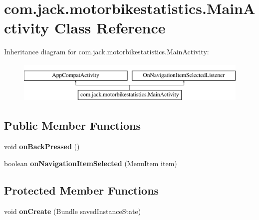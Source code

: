 \hypertarget{classcom_1_1jack_1_1motorbikestatistics_1_1_main_activity}{}\section{com.\+jack.\+motorbikestatistics.\+Main\+Activity Class Reference}
\label{classcom_1_1jack_1_1motorbikestatistics_1_1_main_activity}
Inheritance diagram for com.\+jack.\+motorbikestatistics.\+Main\+Activity\+:\begin{figure}[H]
\begin{center}
\leavevmode
\includegraphics[height=2.000000cm]{classcom_1_1jack_1_1motorbikestatistics_1_1_main_activity}
\end{center}
\end{figure}
\subsection*{Public Member Functions}
\begin{DoxyCompactItemize}
\item 
\mbox{\label{classcom_1_1jack_1_1motorbikestatistics_1_1_main_activity_a7cc508edb3037695e1a75eb342124fbc}} 
void {\bfseries on\+Back\+Pressed} ()
\item 
\mbox{\label{classcom_1_1jack_1_1motorbikestatistics_1_1_main_activity_a38f3fc764869f436e53413ae14590872}} 
boolean {\bfseries on\+Navigation\+Item\+Selected} (Menu\+Item item)
\end{DoxyCompactItemize}
\subsection*{Protected Member Functions}
\begin{DoxyCompactItemize}
\item 
\mbox{\label{classcom_1_1jack_1_1motorbikestatistics_1_1_main_activity_a69fd97053d686c295dc2c58d5c4ffb79}} 
void {\bfseries on\+Create} (Bundle saved\+Instance\+State)
\end{DoxyCompactItemize}
